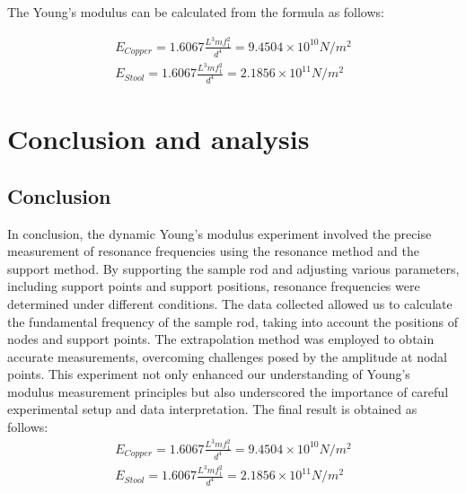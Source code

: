 \documentclass[UTF8]{article}
\begin{document}
  The Young's modulus can be calculated from the formula as follows:
  
  \begin{eqnarray}
  E_{Copper} = 1.6067 \frac{L^3mf_{1}^2}{d^4} = 9.4504 \times 10^10 N/m^2\\
  E_{Stool} = 1.6067 \frac{L^3mf_{1}^2}{d^4} = 2.1856 \times 10^11 N/m^2
  \end{eqnarray}
  

\section{Conclusion and analysis}
\subsection{Conclusion}
In conclusion, the dynamic Young's modulus experiment involved the precise measurement of resonance frequencies using the resonance method and the support method. By supporting the sample rod and adjusting various parameters, including support points and support positions, resonance frequencies were determined under different conditions. The data collected allowed us to calculate the fundamental frequency of the sample rod, taking into account the positions of nodes and support points. The extrapolation method was employed to obtain accurate measurements, overcoming challenges posed by the amplitude at nodal points. This experiment not only enhanced our understanding of Young's modulus measurement principles but also underscored the importance of careful experimental setup and data interpretation.
The final result is obtained as follows:
  \begin{eqnarray}
  E_{Copper} = 1.6067 \frac{L^3mf_{1}^2}{d^4} = 9.4504 \times 10^10 N/m^2\\
  E_{Stool} = 1.6067 \frac{L^3mf_{1}^2}{d^4} = 2.1856 \times 10^11 N/m^2
  \end{eqnarray}
\end{document}
